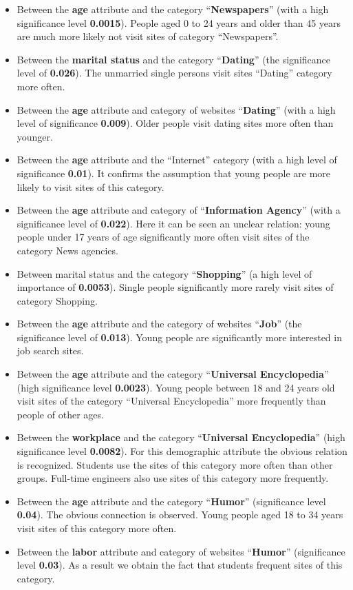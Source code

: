 \documentclass[runningheads,a4paper]{llncs}
\begin{document}
\begin{itemize}
	\item Between the \textbf{age} attribute and the category ``\textbf{Newspapers}'' (with a high significance level \textbf{0.0015}). People aged 0 to 24 years and older than 45 years are much more likely not visit sites of category ``Newspapers''.
	\item Between the \textbf{marital status} and the category ``\textbf{Dating}'' (the significance level of \textbf{0.026}). The unmarried single persons visit sites ``Dating'' category more often.
	\item Between the \textbf{age} attribute and category of websites ``\textbf{Dating}'' (with a high level of significance \textbf{0.009}). Older people visit dating sites more often than younger.
	\item Between the \textbf{age} attribute and the ``Internet'' category (with a high level of significance \textbf{0.01}). It confirms the assumption that young people are more likely to visit sites of this category.
	\item Between the \textbf{age} attribute and category of ``\textbf{Information Agency}'' (with a significance level of \textbf{0.022}). Here it can be seen an unclear relation: young people under 17 years of age significantly more often visit sites of the category News agencies.
	\item Between marital status and the category ``\textbf{Shopping}'' (a high level of importance of \textbf{0.0053}). Single people significantly more rarely visit sites of category Shopping.
	\item Between the \textbf{age} attribute and the category of websites ``\textbf{Job}'' (the significance level of \textbf{0.013}). Young people are significantly more interested in job search sites.
	\item Between the \textbf{age} attribute and the category ``\textbf{Universal Encyclopedia}'' (high significance level \textbf{0.0023}). 
	Young people between 18 and 24 years old visit sites of the category ``Universal Encyclopedia'' more frequently than people of other ages.
	\item Between the \textbf{workplace} and the category ``\textbf{Universal Encyclopedia}'' (high significance level \textbf{0.0082}). For this demographic attribute the obvious relation is recognized. Students use the sites of this category more often than other groups. Full-time engineers also use sites of this category more frequently.
	\item Between the \textbf{age} attribute and the category ``\textbf{Humor}'' (significance level \textbf{0.04}). The obvious connection is observed. Young people aged 18 to 34 years visit sites of this category more often.
	\item Between the \textbf{labor} attribute and category of websites ``\textbf{Humor}'' (significance level \textbf{0.03}). As a result we obtain the fact that students frequent sites of this category.
\end{itemize}
\end{document}
